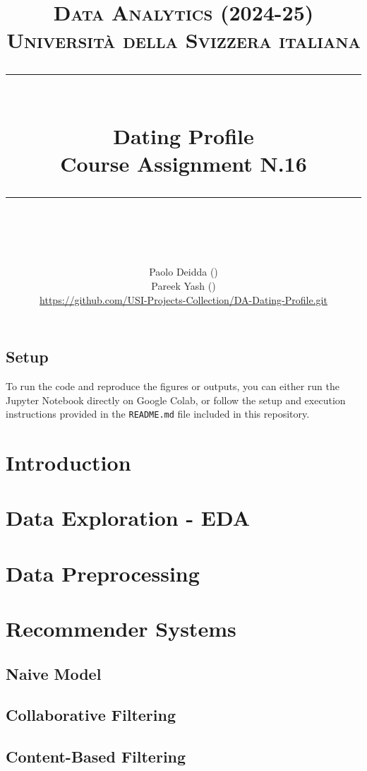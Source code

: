 \documentclass{article}
\title{
	\normalfont\normalsize
	\textsc{Data Analytics (2024-25)\\
	Universit\`a della Svizzera italiana}\\
	\rule{\linewidth}{0.5pt}\\
	{\huge Dating Profile\\
	\small Course Assignment N.16}\\
	\rule{\linewidth}{1pt}\\
	\vspace{5pt}
}
\author{
	Paolo Deidda (\text{paolo.deidda@usi.ch}) \\ 
	Pareek Yash (\text{yash.pareek@usi.ch})\\
	\url{https://github.com/USI-Projects-Collection/DA-Dating-Profile.git}
	}
\begin{document}
\maketitle

\tableofcontents


\vspace*{\fill}

\subsection*{Setup}

To run the code and reproduce the figures or outputs, you can either run the Jupyter Notebook directly on Google Colab, or follow the setup and execution instructions provided in the \texttt{README.md} file included in this repository.

\section*{Introduction}



\section{Data Exploration - EDA}


\section{Data Preprocessing}



\section{Recommender Systems}
\subsection{Naive Model}

\subsection{Collaborative Filtering}

\subsection{Content-Based Filtering}

\end{document}
